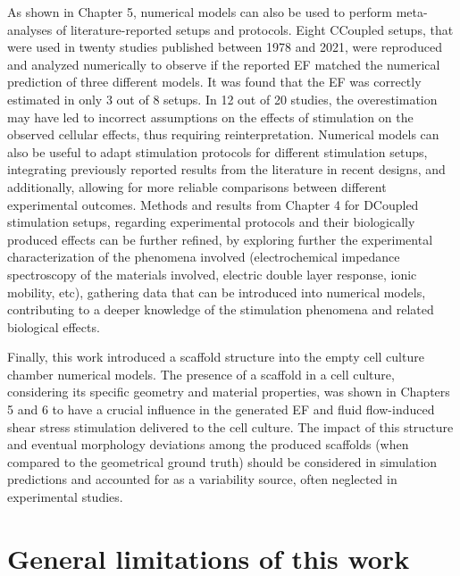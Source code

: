 As shown in Chapter 5, numerical models can also be used to perform meta-analyses of literature-reported setups and protocols. Eight \acs{CCoupled} setups, that were used in twenty studies published between 1978 and 2021, were reproduced and analyzed numerically to observe if the reported \acs{EF} matched the numerical prediction of three different models. It was found that the \acs{EF} was correctly estimated in only 3 out of 8 setups. In 12 out of 20 studies, the overestimation may have led to incorrect assumptions on the effects of stimulation on the observed cellular effects, thus requiring reinterpretation. Numerical models can also be useful to adapt stimulation protocols for different stimulation setups, integrating previously reported results from the literature in recent designs, and additionally, allowing for more reliable comparisons between different experimental outcomes. Methods and results from Chapter 4 for \acs{DCoupled} stimulation setups, regarding experimental protocols and their biologically produced effects can be further refined, by exploring further the experimental characterization of the phenomena involved (electrochemical impedance spectroscopy of the materials involved, electric double layer response, ionic mobility, etc), gathering data that can be introduced into numerical models, contributing to a deeper knowledge of the stimulation phenomena and related biological effects. 

Finally, this work introduced a scaffold structure into the empty cell culture chamber numerical models. The presence of a scaffold in a cell culture, considering its specific geometry and material properties, was shown in Chapters 5 and 6 to have a crucial influence in the generated \acs{EF} and fluid flow-induced shear stress stimulation delivered to the cell culture. The impact of this structure and eventual morphology deviations among the produced scaffolds (when compared to the geometrical ground truth) should be considered in simulation predictions and accounted for as a variability source, often neglected in experimental studies. 




\section{General limitations of this work}

